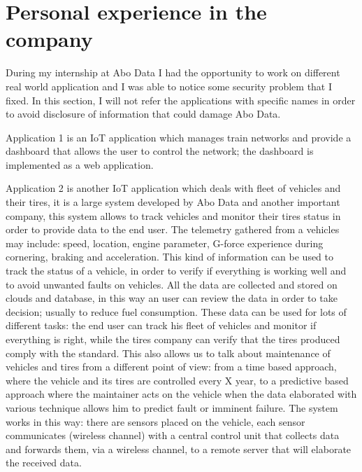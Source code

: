 

\section{Personal experience in the company}

During my internship at Abo Data I had the opportunity to work on different real world application and I was able to notice some security problem that I fixed.\newline
In this section, I will not refer the applications with specific names in order to avoid disclosure of information that could damage Abo Data.

Application 1 is an IoT application which manages train networks and provide a dashboard that allows the user to control the network; the dashboard is implemented as a web application.\newline

Application 2 is another IoT application which deals with fleet of vehicles and their tires, it is a large system developed by Abo Data and another important company, 
this system allows to track vehicles and monitor their tires status in order to provide data to the end user.\newline
The telemetry gathered from a vehicles may include: speed, location, engine parameter, G-force experience during cornering, braking and acceleration.\newline
This kind of information can be used to track the status of a vehicle, in order to verify if everything is working well and to avoid unwanted faults on vehicles.\newline
All the data are collected and stored on clouds and database, in this way an user can review the data in order to take decision; usually to reduce fuel consumption.\newline
These data can be used for lots of different tasks: the end user can track his fleet of vehicles and monitor if everything is right, while the tires company can verify that the tires produced comply with the standard.\newline
This also allows us to talk about maintenance of vehicles and tires from a different point of view: from a time based
approach, where the vehicle and its tires are controlled every X year, to a predictive based approach where the maintainer acts on the vehicle when the data elaborated with various technique allows him to predict fault or imminent failure.\newline
The system works in this way: there are sensors placed on the vehicle, each sensor communicates (wireless channel) with a central control unit that collects data and forwards them,  via a wireless channel, to a remote server that will elaborate the received data.\\

